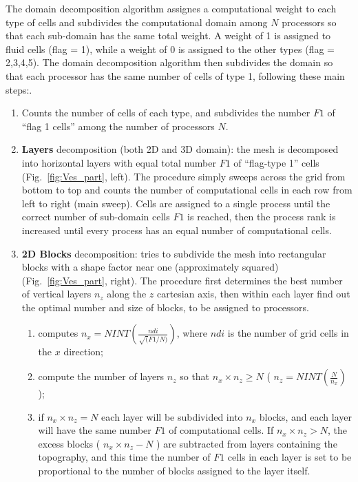 The domain decomposition algorithm assignes a computational weight to each type 
of cells and subdivides the computational domain
among $N$ processors so that each sub-domain has the same total weight.
A weight of 1 is assigned to fluid cells (flag = 1),
while a weight of 0 is assigned to the other types (flag = 2,3,4,5). 
The domain decomposition algorithm then subdivides the domain so that each processor
has the same number of cells of type 1, following these main steps:.\\
\begin{enumerate}
\item Counts the number of cells of each type, and subdivides the number $F1$ of ``flag 1 cells''
 among the number of processors $N$.
\item {\bf Layers} decomposition (both 2D and 3D domain): the mesh is decomposed into horizontal 
layers with equal total number
$F1$ of ``flag-type 1'' cells (Fig.~\ref{fig:Ves_part}, left). The procedure simply sweeps across
the grid from bottom to top and counts the number of computational cells in each row from
left to right (main sweep). Cells are assigned to a single process until the correct number 
of sub-domain cells $F1$ is reached, then the process rank is increased until every 
process has an equal number of computational cells.
\item {\bf  2D Blocks } decomposition: tries to subdivide the mesh
into rectangular blocks with a shape factor near one (approximately squared) 
(Fig.~\ref{fig:Ves_part}, right). The procedure first determines the best number
of vertical layers $n_z$ along the $z$ cartesian axis, then within each 
layer find out the optimal number and size of blocks, to be assigned to processors.
\begin{enumerate}
\item computes $\displaystyle n_x = NINT\left(\frac{ndi}{\sqrt(F1/N)}\right)$, where $ndi$ is the
number of grid cells in the $x$ direction;
\item compute the number of layers $n_z$ so that $n_x \times n_z \ge N$ 
( $\displaystyle n_z = NINT\left(\frac{N}{n_x}\right)$ );
\item if $n_x \times n_z = N$ each layer will be subdivided into $n_x$ blocks, and each layer
will have the same number $F1$ of computational cells. If $n_x \times n_z > N$, the excess blocks
( $n_x \times n_z - N$ ) are subtracted from layers containing the topography, and this time
the number of $F1$ cells in each layer is set to be proportional to the number of blocks
assigned to the layer itself. 

\end{enumerate}
\end{enumerate}
